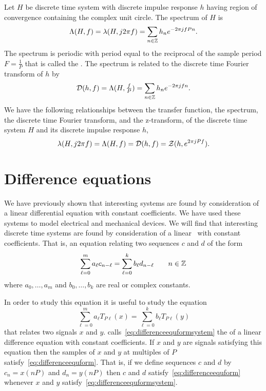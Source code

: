 Let $H$ be discrete time system with discrete impulse response $h$ having region of convergence containing the complex unit circle.  The spectrum of $H$ is
\[
\Lambda(H,f) = \lambda(H, j2\pi f) = \sum_{n \in {\mathbb Z}} h_n e^{-2\pi j f P n}.
\]
The spectrum is periodic with period equal to the reciprocal of the sample period $F = \frac{1}{P}$ that is called the . The spectrum is related to the discrete time Fourier transform of $h$ by
\[
{\mathcal D}(h,f) = \Lambda(H,\tfrac{f}{P}) =\sum_{n \in {\mathbb Z}} h_n e^{-2\pi j f n}.
\]
We have the following relationships between the transfer function, the spectrum, the discrete time Fourier transform, and the z-transform, of the discrete time system $H$ and its discrete impulse response $h$,
\[
\lambda(H, j2\pi f) = \Lambda(H,f) = {\mathcal D}(h,f) = {\mathcal Z}(h, e^{2\pi j P f}).
\]

\section{Difference equations}\label{sec:difference-equations}

\nocite{SolimanAndSrinath_1990}

We have previously shown that interesting systems are found by consideration of a linear differential equation with constant coefficients.  We have used these systems to model electrical and mechanical devices.  We will find that interesting discrete time systems are found by consideration of a linear~ with constant coefficients.  That is, an equation relating two sequences $c$ and $d$ of the form
\begin{equation}\label{eq:differenceequform}
\sum_{\ell=0}^{m} a_\ell c_{n - \ell} = \sum_{\ell=0}^{k} b_\ell d_{n - \ell} \qquad n \in {\mathbb Z}
\end{equation}
where $a_0,\dots,a_m$ and $b_0,\dots,b_k$ are real or complex constants.

In order to study this equation it is useful to study the equation
\begin{equation}\label{eq:differenceequformsystem}
\sum_{\ell=0}^{m} a_\ell T_{P\ell}(x) = \sum_{\ell=0}^{k} b_\ell T_{P\ell}(y)
\end{equation}
that relates two signals $x$ and $y$.  \citet[Sec.~9.5]{Zemanian_dist_theory_1965} calls~\eqref{eq:differenceequformsystem} the  of a linear difference equation with constant coefficients.  If $x$ and $y$ are signals satisfying this equation then the samples of $x$ and $y$ at multiples of $P$ satisfy~\eqref{eq:differenceequform}.  That is, if we define sequences $c$ and $d$ by $c_n = x(nP)$ and $d_n = y(nP)$ then $c$ and $d$ satisfy~\eqref{eq:differenceequform} whenever $x$ and $y$ satisfy~\eqref{eq:differenceequformsystem}.

